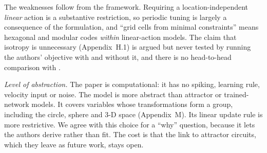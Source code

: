 \documentclass[10pt,letterpaper]{article}
\begin{document}
The weaknesses follow from the framework. Requiring a location-independent \emph{linear} action is a substantive restriction, so periodic tuning is largely a consequence of the formulation, and ``grid cells from minimal constraints'' means hexagonal and modular codes \emph{within} linear-action models. The claim that isotropy is unnecessary (Appendix~H.1) is argued but never tested by running the authors' objective with and without it, and there is no head-to-head comparison with \citet{sorscher2019}.

\emph{Level of abstraction.} The paper is computational: it has no spiking, learning rule, velocity input or noise. The model is more abstract than attractor or trained-network models. It covers variables whose transformations form a group, including the circle, sphere and 3-D space (Appendix~M). Its linear update rule is more restrictive. We agree with this choice for a ``why'' question, because it lets the authors derive rather than fit. The cost is that the link to attractor circuits, which they leave as future work, stays open.
\end{document}
